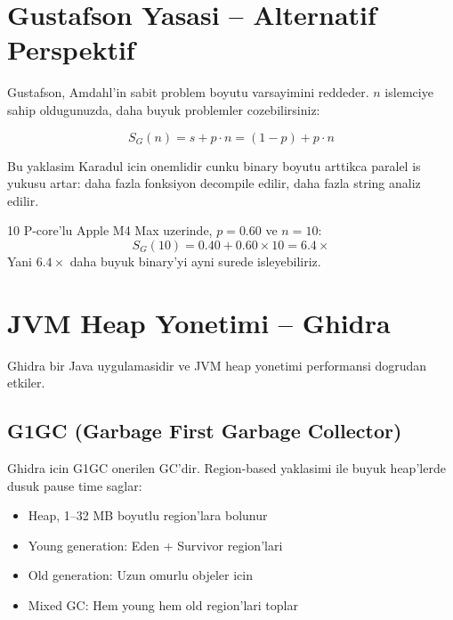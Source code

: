 \section{Gustafson Yasasi -- Alternatif Perspektif}
\label{sec:gustafson}

Gustafson, Amdahl'in sabit problem boyutu varsayimini reddeder.
$n$ islemciye sahip oldugunuzda, daha buyuk problemler cozebilirsiniz:

\begin{equation}
  S_G(n) = s + p \cdot n = (1 - p) + p \cdot n
  \label{eq:gustafson}
\end{equation}

Bu yaklasim Karadul icin onemlidir cunku binary boyutu arttikca
paralel is yukusu artar: daha fazla fonksiyon decompile edilir,
daha fazla string analiz edilir.

\begin{example}
10 P-core'lu Apple M4 Max uzerinde, $p = 0.60$ ve $n = 10$:
\begin{equation}
  S_G(10) = 0.40 + 0.60 \times 10 = 6.4 \times
\end{equation}
Yani $6.4\times$ daha buyuk binary'yi ayni surede isleyebiliriz.
\end{example}


\section{JVM Heap Yonetimi -- Ghidra}
\label{sec:jvm-heap}

Ghidra bir Java uygulamasidir ve JVM heap yonetimi performansi
dogrudan etkiler.

\subsection{G1GC (Garbage First Garbage Collector)}

Ghidra icin G1GC onerilen GC'dir. Region-based yaklasimi ile
buyuk heap'lerde dusuk pause time saglar:

\begin{itemize}
  \item Heap, 1--32 MB boyutlu region'lara bolunur
  \item Young generation: Eden + Survivor region'lari
  \item Old generation: Uzun omurlu objeler icin
  \item Mixed GC: Hem young hem old region'lari toplar
\end{itemize}

